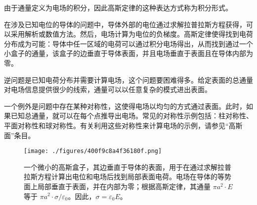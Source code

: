 由于通量定义为电场的积分，因此高斯定律的这种表达方式称为积分形式。

在涉及已知电位的导体的问题中，导体外部的电位通过求解拉普拉斯方程获得，可以采用解析或数值方法。然后，电场计算为电位的负梯度。高斯定律使得找到电荷分布成为可能：导体中任一区域的电荷可以通过积分电场得出，从而找到通过一个小盒子的通量，该盒子的边垂直于导体表面，并且电场垂直于表面且在导体内部为零。

逆问题是已知电荷分布并需要计算电场，这个问题要困难得多。给定表面的总通量对电场信息提供很少的线索，通量可以以任意复杂的模式进出表面。

一个例外是问题中存在某种对称性，这使得电场以均匀的方式通过表面。此时，如果已知总通量，就可以在每个点推导出电场。常见的对称性示例包括：柱对称性、平面对称性和球对称性。有关利用这些对称性来计算电场的示例，请参见“高斯面”条目。
\begin{figure}[ht]
\centering
\texttt{[image: ./figures/400f9c8a4f36180f.png]}
\caption{一个微小的高斯盒子，其边垂直于导体的表面，用于在通过求解拉普拉斯方程计算出电位和电场后找到局部表面电荷。电场在导体的等势面上局部垂直于表面，并在内部为零；根据高斯定律，其通量 \( \pi a^2 \cdot E \) 等于 \( \pi a^2 \cdot \sigma / \varepsilon_0 \)。因此，\(\sigma = \varepsilon_0 E\)。} \label{fig_GSDL_4}
\end{figure}